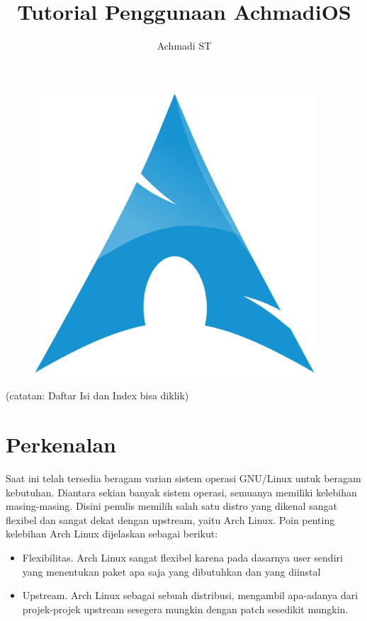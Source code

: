 \documentclass[12pt,]{article}
\title{\Large \bf
Tutorial Penggunaan AchmadiOS
}
\author{Achmadi ST}
\date{}
\begin{document}
	
	\maketitle
	\thispagestyle{empty}
	\pagestyle{empty}
	
	\begin{figure}[!ht]
		\centering
		\includegraphics[width=300pt]{archlinuxlogo.png}
	\end{figure}

	\newpage
	(catatan: Daftar Isi dan Index bisa diklik)
	\tableofcontents
	
	\newpage
	\section{Perkenalan}

	Saat ini telah tersedia beragam varian sistem operasi GNU/Linux untuk beragam kebutuhan.
	Diantara sekian banyak sistem operasi, semuanya memiliki kelebihan masing-masing.
	Disini penulis memilih salah satu distro yang dikenal sangat flexibel dan sangat dekat dengan upstream, yaitu Arch Linux.
	Poin penting kelebihan Arch Linux dijelaskan sebagai berikut:

	\begin{itemize}
		\item Flexibilitas. Arch Linux sangat flexibel karena pada dasarnya user sendiri yang menentukan paket apa saja yang dibutuhkan dan yang diinstal
		\item Upstream. Arch Linux sebagai sebuah distribusi, mengambil apa-adanya dari projek-projek upstream sesegera mungkin dengan patch sesedikit mungkin.
	\end{itemize}
\end{document}
